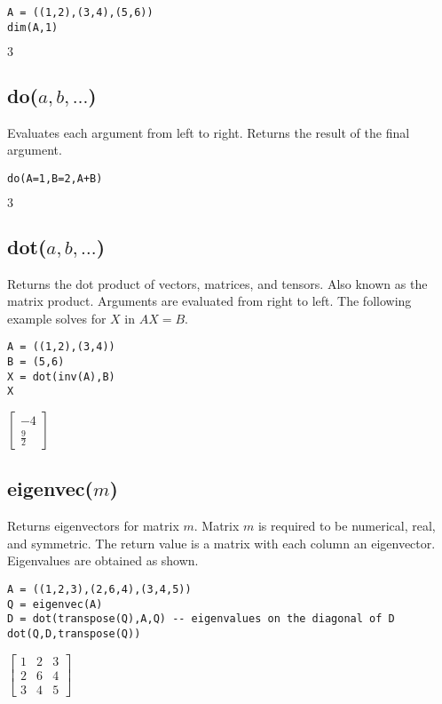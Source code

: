 {\color{blue}
\begin{verbatim}
A = ((1,2),(3,4),(5,6))
dim(A,1)
\end{verbatim}
}

\noindent
$3$

\subsection*{do($a,b,\ldots$)}

Evaluates each argument from left to right.
Returns the result of the final argument.

{\color{blue}
\begin{verbatim}
do(A=1,B=2,A+B)
\end{verbatim}
}

\noindent
$3$

\subsection*{dot($a,b,\ldots$)}

Returns the dot product of vectors, matrices, and tensors.
Also known as the matrix product.
Arguments are evaluated from right to left.
The following example solves for $X$ in $AX=B$.

{\color{blue}
\begin{verbatim}
A = ((1,2),(3,4))
B = (5,6)
X = dot(inv(A),B)
X
\end{verbatim}
}

\noindent
$\displaystyle
\begin{bmatrix}
-4
\\[1ex]
\tfrac{9}{2}
\end{bmatrix}
$

\subsection*{eigenvec($m$)}

Returns eigenvectors for matrix $m$.
Matrix $m$ is required to be numerical, real, and symmetric.
The return value is a matrix with each column an eigenvector.
Eigenvalues are obtained as shown.

{\color{blue}
\begin{verbatim}
A = ((1,2,3),(2,6,4),(3,4,5))
Q = eigenvec(A)
D = dot(transpose(Q),A,Q) -- eigenvalues on the diagonal of D
dot(Q,D,transpose(Q))
\end{verbatim}
}

\noindent
$\displaystyle
\begin{bmatrix}
1 & 2 & 3
\\[1ex]
2 & 6 & 4
\\[1ex]
3 & 4 & 5
\end{bmatrix}
$

